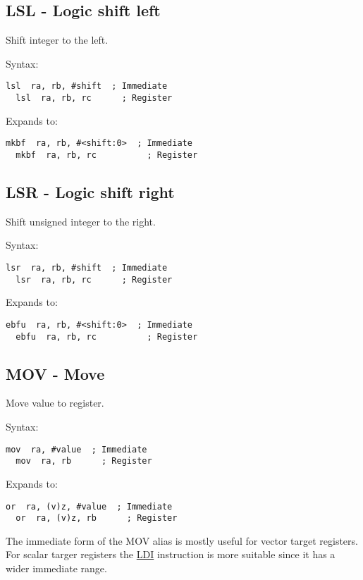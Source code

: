 \subsection{LSL - Logic shift left}
\label{insn:LSL}

Shift integer to the left.

Syntax:
\begin{lstlisting}[style=assembler]
  lsl  ra, rb, #shift  ; Immediate
  lsl  ra, rb, rc      ; Register
\end{lstlisting}

Expands to:
\begin{lstlisting}[style=assembler]
  mkbf  ra, rb, #<shift:0>  ; Immediate
  mkbf  ra, rb, rc          ; Register
\end{lstlisting}

\subsection{LSR - Logic shift right}
\label{insn:LSR}

Shift unsigned integer to the right.

Syntax:
\begin{lstlisting}[style=assembler]
  lsr  ra, rb, #shift  ; Immediate
  lsr  ra, rb, rc      ; Register
\end{lstlisting}

Expands to:
\begin{lstlisting}[style=assembler]
  ebfu  ra, rb, #<shift:0>  ; Immediate
  ebfu  ra, rb, rc          ; Register
\end{lstlisting}

\subsection{MOV - Move}
\label{insn:MOV}

Move value to register.

Syntax:
\begin{lstlisting}[style=assembler]
  mov  ra, #value  ; Immediate
  mov  ra, rb      ; Register
\end{lstlisting}

Expands to:
\begin{lstlisting}[style=assembler]
  or  ra, (v)z, #value  ; Immediate
  or  ra, (v)z, rb      ; Register
\end{lstlisting}

\begin{notebox}
The immediate form of the MOV alias is mostly useful for vector target
registers. For scalar targer registers the \hyperref[insn:LDI]{LDI} instruction
is more suitable since it has a wider immediate range.
\end{notebox}


